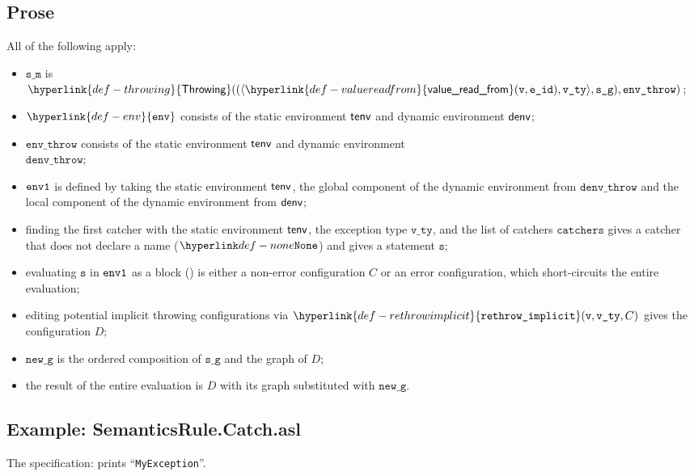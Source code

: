 \documentclass{book}
\newcommand\ProseOrError[0]{or an error configuration, which short-circuits the entire evaluation}
\newcommand\rethrowimplicit[0]{\hyperlink{def-rethrowimplicit}{\texttt{rethrow\_implicit}}}
\newcommand\valuereadfrom[0]{\hyperlink{def-valuereadfrom}{\textsf{value\_read\_from}}}
\newcommand\Throwing[0]{\hyperlink{def-throwing}{\textsf{Throwing}}}
\newcommand\env[0]{\hyperlink{def-env}{\texttt{env}}}
\newcommand\newg[0]{\texttt{new\_g}}
\newcommand\vs[0]{\texttt{s}}
\newcommand\catchers[0]{\texttt{catchers}}
\newcommand\envthrow[0]{\texttt{env\_throw}}
\newcommand\denvthrow[0]{\texttt{denv\_throw}}
\newcommand\sm[0]{\texttt{s\_m}}
\newcommand\sg[0]{\texttt{s\_g}}
\newcommand\vvty[0]{\texttt{v\_ty}}
\newcommand\eid[0]{\texttt{e\_id}}
\begin{document}
  \subsection{Prose}
  All of the following apply:
  \begin{itemize}
  \item $\sm$ is $\Throwing((\langle \valuereadfrom(\vv, \eid), \vvty \rangle, \sg), \envthrow)$;
  \item $\env$ consists of the static environment $\textsf{tenv}$ and dynamic environment $\textsf{denv}$;
  \item $\envthrow$ consists of the static environment $\textsf{tenv}$ and dynamic environment \\ $\denvthrow$;
  \item $\texttt{env1}$ is defined by taking the static environment $\textsf{tenv}$, the global component of the dynamic
  environment from $\denvthrow$ and the local component of the dynamic environment from $\textsf{denv}$;
  \item finding the first catcher with the static environment $\textsf{tenv}$, the exception type $\vvty$,
  and the list of catchers $\catchers$ gives a catcher that does not declare a name ($\None$) and gives a statement $\vs$;
  \item evaluating $\vs$ in $\texttt{env1}$ as a block () is either a non-error
  configuration $C$ \ProseOrError;
  \item editing potential implicit throwing configurations via $\rethrowimplicit(\vv, \vvty, C)$
  gives the configuration $D$;
  \item $\newg$ is the ordered composition of $\sg$ and the graph of $D$;
  \item the result of the entire evaluation is $D$ with its graph substituted with $\newg$.
  \end{itemize}

    \subsection{Example: SemanticsRule.Catch.asl}
    The specification:
    prints ``\texttt{MyException}''.


\end{document}
